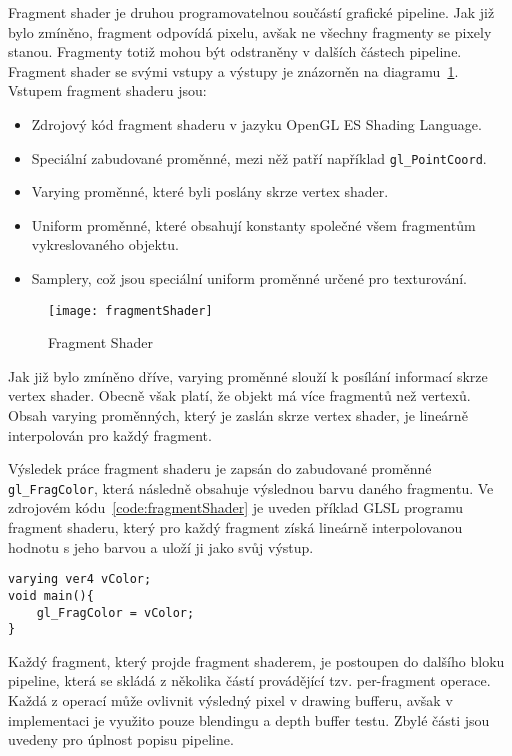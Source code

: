 Fragment shader je druhou programovatelnou součástí grafické pipeline. Jak již bylo zmíněno, fragment odpovídá pixelu, avšak ne všechny fragmenty se pixely stanou. Fragmenty totiž mohou být odstraněny v dalších částech pipeline. Fragment shader se svými vstupy a výstupy je znázorněn na diagramu~\ref{fig:fragmentShader}. Vstupem fragment shaderu jsou:
\begin{itemize}
\item Zdrojový kód fragment shaderu v jazyku OpenGL ES Shading Language.
\item Speciální zabudované proměnné, mezi něž patří například \texttt{gl\_PointCoord}.
\item Varying proměnné, které byli poslány skrze vertex shader.
\item Uniform proměnné, které obsahují konstanty společné všem fragmentům vykreslovaného objektu.
\item Samplery, což jsou speciální uniform proměnné určené pro texturování.
\end{itemize}

\begin{figure}[htb]
\centering
\texttt{[image: fragmentShader]}
\caption{Fragment Shader}
\label{fig:fragmentShader}
\end{figure}



Jak již bylo zmíněno dříve, varying proměnné slouží k posílání informací skrze vertex shader. Obecně však platí, že objekt má více fragmentů než vertexů. Obsah varying proměnných, který je zaslán skrze vertex shader, je lineárně interpolován pro každý fragment. 

Výsledek práce fragment shaderu je zapsán do zabudované proměnné \texttt{gl\_FragColor}, která následně obsahuje výslednou barvu daného fragmentu. Ve zdrojovém kódu~\ref{code:fragmentShader} je uveden příklad GLSL programu fragment shaderu, který pro každý fragment získá lineárně interpolovanou hodnotu s jeho barvou a uloží ji jako svůj výstup.

\label{code:fragmentShader}
\begin{lstlisting}[caption=Příklad jednoduchého GLSL programu fragment shaderu]
varying ver4 vColor;
void main(){
	gl_FragColor = vColor;
}
\end{lstlisting}

Každý fragment, který projde fragment shaderem, je postoupen do dalšího bloku pipeline, která se skládá z několika částí provádějící tzv. per-fragment operace. Každá z operací může ovlivnit výsledný pixel v drawing bufferu, avšak v implementaci je využito pouze blendingu a depth buffer testu. Zbylé části jsou uvedeny pro úplnost popisu pipeline.

